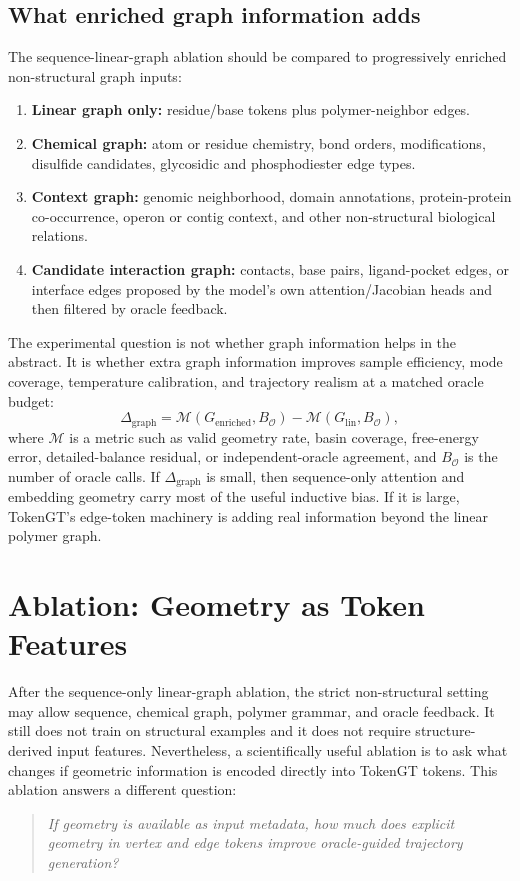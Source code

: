 \documentclass[11pt]{article}
\newcommand{\oracle}{\mathcal{O}}
\begin{document}
\subsection{What enriched graph information adds}

The sequence-linear-graph ablation should be compared to progressively enriched non-structural graph inputs:
\begin{enumerate}[leftmargin=2em]
  \item \textbf{Linear graph only:} residue/base tokens plus polymer-neighbor edges.
  \item \textbf{Chemical graph:} atom or residue chemistry, bond orders, modifications, disulfide candidates, glycosidic and phosphodiester edge types.
  \item \textbf{Context graph:} genomic neighborhood, domain annotations, protein-protein co-occurrence, operon or contig context, and other non-structural biological relations.
  \item \textbf{Candidate interaction graph:} contacts, base pairs, ligand-pocket edges, or interface edges proposed by the model's own attention/Jacobian heads and then filtered by oracle feedback.
\end{enumerate}

The experimental question is not whether graph information helps in the abstract. It is whether extra graph information improves sample efficiency, mode coverage, temperature calibration, and trajectory realism at a matched oracle budget:
\[
\Delta_{\mathrm{graph}}
=
\mathcal{M}(G_{\mathrm{enriched}},B_{\oracle})
-
\mathcal{M}(G_{\mathrm{lin}},B_{\oracle}),
\]
where $\mathcal{M}$ is a metric such as valid geometry rate, basin coverage, free-energy error, detailed-balance residual, or independent-oracle agreement, and $B_{\oracle}$ is the number of oracle calls. If $\Delta_{\mathrm{graph}}$ is small, then sequence-only attention and embedding geometry carry most of the useful inductive bias. If it is large, TokenGT's edge-token machinery is adding real information beyond the linear polymer graph.

\section{Ablation: Geometry as Token Features}

After the sequence-only linear-graph ablation, the strict non-structural setting may allow sequence, chemical graph, polymer grammar, and oracle feedback. It still does not train on structural examples and it does not require structure-derived input features. Nevertheless, a scientifically useful ablation is to ask what changes if geometric information is encoded directly into TokenGT tokens. This ablation answers a different question:
\begin{quote}
\emph{If geometry is available as input metadata, how much does explicit geometry in vertex and edge tokens improve oracle-guided trajectory generation?}
\end{quote}
\end{document}
